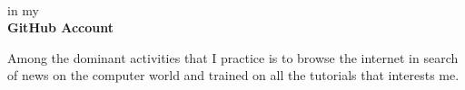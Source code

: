 \documentclass[10pt,A4]{article}
\begin{document}
\begin{minipage}{0.59\textwidth}
{		%
		\parbox[b][3cm][c]{3cm}{
			\begin{center}
			\\
			\textcolor{textcol}{in my}\\
			\textcolor{textcol}{\textbf{GitHub Account \\ \faGithub}}
			\end{center}
		}

		\parbox[b][3cm][c]{3.5cm}{
			\begin{center}
			\textcolor{textcol}{Among the dominant activities that I practice is to browse the internet in search of news on the computer world and trained on all the tutorials that interests me.}
			\end{center}
		}
	}

\end{minipage}
\hspace{5pt}
\begin{minipage}{0.01\textwidth}
	\begin{center}
	\end{center}
\end{minipage}
\end{document}
